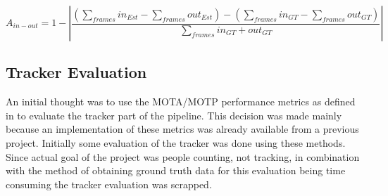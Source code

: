 \begin{equation}
\label{eq:occupacy_accuracy}
A_{in-out} = 1 - |\frac{(\sum_{frames}{in_{Est}-\sum_{frames}out_{Est}})-(\sum_{frames}{in_{GT}-\sum_{frames}out_{GT}})}{\sum_{frames}in_{GT}+out_{GT}}| 
\end{equation} 

\subsection{Tracker Evaluation}
An initial thought was to use the MOTA/MOTP performance metrics as defined in \cite{MOTA} to evaluate the tracker part of the pipeline. This decision was made mainly because an implementation of these metrics was already available from a previous project. Initially some evaluation of the tracker was done using these methods. Since actual goal of the project was people counting, not tracking, in combination with the method of obtaining ground truth data for this evaluation being time consuming the tracker evaluation was scrapped.


